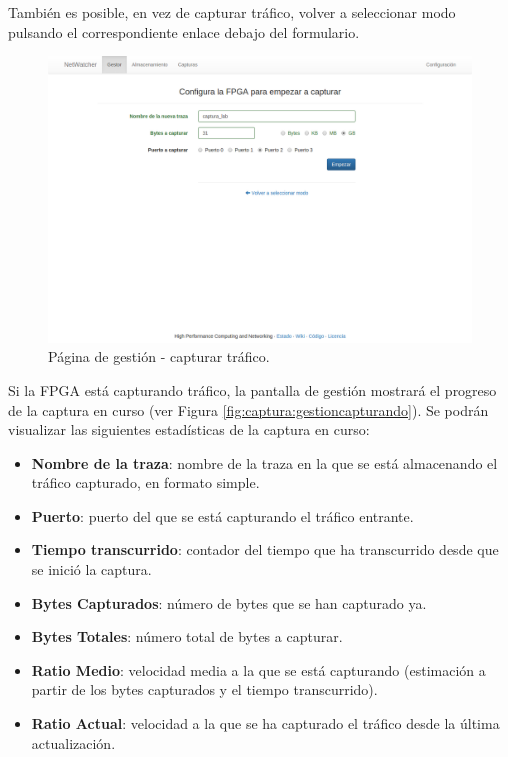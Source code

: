 También es posible, en vez de capturar tráfico, volver a seleccionar modo pulsando el correspondiente enlace debajo del formulario.

\begin{figure}[!htp]
  \centering
  \includegraphics[width=\textwidth,clip=true]{graphics/capturas/gestor_capturar}
  \caption{Página de gestión - capturar tráfico.}
  \label{fig:captura:gestioncapturar}
\end{figure}

Si la \gls{FPGA} está capturando tráfico, la pantalla de gestión mostrará el progreso de la captura en curso (ver Figura \ref{fig:captura:gestioncapturando}). Se podrán visualizar las siguientes estadísticas de la captura en curso:
\begin{itemize}
  \item \textbf{Nombre de la traza}: nombre de la \gls{traza} en la que se está almacenando el tráfico capturado, en formato \gls{simple}.
  \item \textbf{Puerto}: puerto del que se está capturando el tráfico entrante.
  \item \textbf{Tiempo transcurrido}: contador del tiempo que ha transcurrido desde que se inició la captura.
  \item \textbf{Bytes Capturados}: número de bytes que se han capturado ya.
  \item \textbf{Bytes Totales}: número total de bytes a capturar.
  \item \textbf{Ratio Medio}: velocidad media a la que se está capturando (estimación a partir de los bytes capturados y el tiempo transcurrido).
  \item \textbf{Ratio Actual}: velocidad a la que se ha capturado el tráfico desde la última actualización.
\end{itemize}

